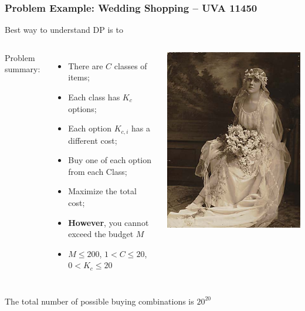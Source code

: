 \begin{frame}
    \frametitle{Problem Example: Wedding Shopping -- UVA 11450}

    \begin{block}{}
      Best way to understand DP is to 
    \end{block}

    \begin{columns}
    Problem summary:
    \begin{itemize}
      \item There are $C$ classes of items;
      \item Each class has $K_c$ options;
      \item Each option $K_{c,i}$ has a different cost;
      \bigskip

      \item Buy one of each option from each Class;
      \item Maximize the total cost;
      \item {\bf However}, you cannot exceed the budget $M$
      \bigskip

      \item $M \leq 200$, $1 < C \leq 20$, $0 < K_c \leq 20$
    \end{itemize}

      \includegraphics[width=.8\textwidth]{../img/weddingdress}\\
    \end{columns}\bigskip

    The total number of possible buying combinations is $20^{20}$

\end{frame}

